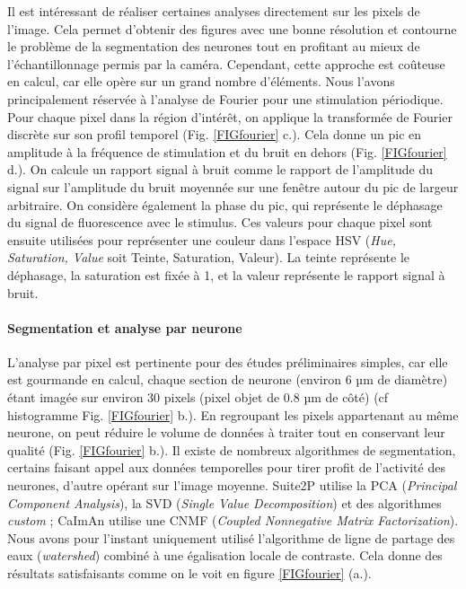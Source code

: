 Il est intéressant de réaliser certaines analyses directement sur les pixels de l'image. Cela permet d'obtenir des figures avec une bonne résolution et contourne le problème de la segmentation des neurones tout en profitant au mieux de l'échantillonnage permis par la caméra. Cependant, cette approche est coûteuse en calcul, car elle opère sur un grand nombre d'éléments. Nous l'avons principalement réservée à l'analyse de Fourier pour une stimulation périodique.
Pour chaque pixel dans la région d'intérêt, on applique la transformée de Fourier discrète sur son profil temporel (Fig. \ref{FIGfourier} c.). Cela donne un pic en amplitude à la fréquence de stimulation et du bruit en dehors (Fig. \ref{FIGfourier} d.). On calcule un rapport signal à bruit comme le rapport de l'amplitude du signal sur l'amplitude du bruit moyennée sur une fenêtre autour du pic de largeur arbitraire. On considère également la phase du pic, qui représente le déphasage du signal de fluorescence avec le stimulus.
Ces valeurs pour chaque pixel sont ensuite utilisées pour représenter une couleur dans l'espace HSV (\emph{Hue, Saturation, Value} soit Teinte, Saturation, Valeur). La teinte représente le déphasage, la saturation est fixée à 1, et la valeur représente le rapport signal à bruit. 

\paragraph{Segmentation et analyse par neurone}

L'analyse par pixel est pertinente pour des études préliminaires simples, car elle est gourmande en calcul, chaque section de neurone (environ 6 µm de diamètre) étant imagée sur environ 30 pixels (pixel objet de 0.8 µm de côté) (cf histogramme Fig. \ref{FIGfourier} b.). En regroupant les pixels appartenant au même neurone, on peut réduire le volume de données à traiter tout en conservant leur qualité (Fig. \ref{FIGfourier} b.). Il existe de nombreux algorithmes de segmentation, certains faisant appel aux données temporelles pour tirer profit de l'activité des neurones, d'autre opérant sur l'image moyenne. Suite2P utilise la PCA (\emph{Principal Component Analysis}), la SVD (\emph{Single Value Decomposition}) et des algorithmes \emph{custom} ; CaImAn utilise une CNMF (\emph{Coupled Nonnegative Matrix Factorization}). Nous avons pour l'instant uniquement utilisé l'algorithme de ligne de partage des eaux (\emph{watershed}) combiné à une égalisation locale de contraste. Cela donne des résultats satisfaisants comme on le voit en figure \ref{FIGfourier} (a.).

